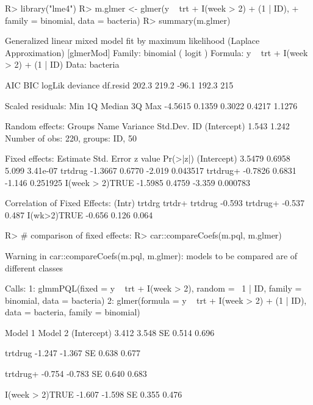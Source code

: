 \documentclass[
]{jss}
\begin{document}
\begin{CodeChunk}
\begin{CodeInput}
R> library("lme4")
R> m.glmer <- glmer(y ~ trt + I(week > 2) + (1 | ID),
+                family = binomial, data = bacteria)
R> summary(m.glmer)
\end{CodeInput}
\begin{CodeOutput}
Generalized linear mixed model fit by maximum likelihood (Laplace
  Approximation) [glmerMod]
 Family: binomial  ( logit )
Formula: y ~ trt + I(week > 2) + (1 | ID)
   Data: bacteria

     AIC      BIC   logLik deviance df.resid 
   202.3    219.2    -96.1    192.3      215 

Scaled residuals: 
    Min      1Q  Median      3Q     Max 
-4.5615  0.1359  0.3022  0.4217  1.1276 

Random effects:
 Groups Name        Variance Std.Dev.
 ID     (Intercept) 1.543    1.242   
Number of obs: 220, groups:  ID, 50

Fixed effects:
                Estimate Std. Error z value Pr(>|z|)
(Intercept)       3.5479     0.6958   5.099 3.41e-07
trtdrug          -1.3667     0.6770  -2.019 0.043517
trtdrug+         -0.7826     0.6831  -1.146 0.251925
I(week > 2)TRUE  -1.5985     0.4759  -3.359 0.000783

Correlation of Fixed Effects:
            (Intr) trtdrg trtdr+
trtdrug     -0.593              
trtdrug+    -0.537  0.487       
I(wk>2)TRUE -0.656  0.126  0.064
\end{CodeOutput}
\begin{CodeInput}
R>   # comparison of fixed effects:
R> car::compareCoefs(m.pql, m.glmer) 
\end{CodeInput}
\begin{CodeOutput}
Warning in car::compareCoefs(m.pql, m.glmer): models to be compared are of
different classes
\end{CodeOutput}
\begin{CodeOutput}
Calls:
1: glmmPQL(fixed = y ~ trt + I(week > 2), random = ~1 | ID, family = 
  binomial, data = bacteria)
2: glmer(formula = y ~ trt + I(week > 2) + (1 | ID), data = bacteria, 
  family = binomial)

                Model 1 Model 2
(Intercept)       3.412   3.548
SE                0.514   0.696
                               
trtdrug          -1.247  -1.367
SE                0.638   0.677
                               
trtdrug+         -0.754  -0.783
SE                0.640   0.683
                               
I(week > 2)TRUE  -1.607  -1.598
SE                0.355   0.476
                               
\end{CodeOutput}
\end{CodeChunk}
\end{document}
